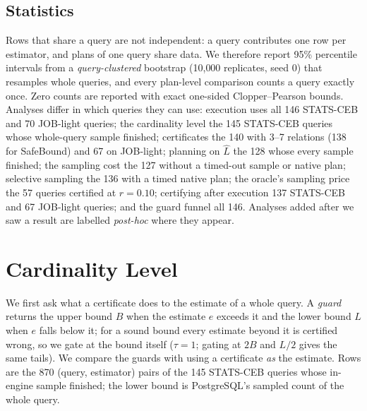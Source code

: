 \documentclass[sigconf, nonacm]{acmart}
\begin{document}
\subsection{Statistics}
Rows that share a query are not independent: a query contributes one row per
estimator, and plans of one query share data. We therefore report 95\%
percentile intervals from a \emph{query-clustered} bootstrap (10{,}000
replicates, seed 0) that resamples whole queries, and every plan-level
comparison counts a query exactly once. Zero counts are reported with exact
one-sided Clopper--Pearson bounds. Analyses differ in which queries they can
use: execution uses all 146 STATS-CEB and 70 JOB-light queries; the cardinality
level the 145 STATS-CEB queries whose whole-query sample finished; certificates
the 140 with 3--7 relations (138 for SafeBound) and 67 on JOB-light; planning on
$\hat L$ the 128 whose every sample finished; the sampling cost the 127 without
a timed-out sample or native plan; selective sampling the 136 with a timed
native plan; the oracle's sampling price the 57 queries certified at $r{=}0.10$;
certifying after execution 137 STATS-CEB and 67 JOB-light queries; and the guard
funnel all 146. Analyses added after we saw a result are
labelled \emph{post-hoc} where they appear.
\section{Cardinality Level}
\label{sec:cardinality}

We first ask what a certificate does to the estimate of a whole query. A
\emph{guard} returns the upper bound $B$ when the estimate $e$ exceeds it and the
lower bound $L$ when $e$ falls below it; for a sound bound every estimate beyond
it is certified wrong, so we gate at the bound itself ($\tau{=}1$; gating at
$2B$ and $L/2$ gives the same tails). We compare the guards with using a
certificate \emph{as} the estimate. Rows are the 870 (query, estimator) pairs of
the 145 STATS-CEB queries whose in-engine sample finished; the lower bound is
PostgreSQL's sampled count of the whole query.
\end{document}
